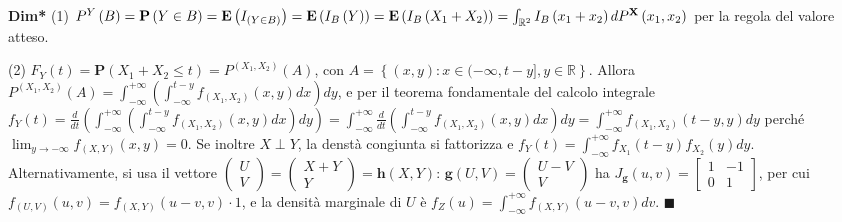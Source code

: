 \documentclass{article}
\begin{document}
\textbf{Dim*} (1) $P^{Y}\left( B\right) =\mathbf{P}\left( Y\in B\right) =%
\mathbf{E}\left( I_{\left( Y\in B\right) }\right) =\mathbf{E}\left(
I_{B}\left( Y\right) \right) =\mathbf{E}\left( I_{B}\left(
X_{1}+X_{2}\right) \right) =\int_{%
\mathbb{R}
^{2}}I_{B}\left( x_{1}+x_{2}\right) dP^{\mathbf{X}}\left( x_{1},x_{2}\right) 
$ per la regola del valore atteso.

(2) $F_{Y}\left( t\right) =\mathbf{P}\left( X_{1}+X_{2}\leq t\right)
=P^{\left( X_{1},X_{2}\right) }\left( A\right) $, con $A=\left\{ \left(
x,y\right) :x\in (-\infty ,t-y],y\in 
\mathbb{R}
\right\} $. Allora $P^{\left( X_{1},X_{2}\right) }\left( A\right)
=\int_{-\infty }^{+\infty }\left( \int_{-\infty }^{t-y}f_{\left(
X_{1},X_{2}\right) }\left( x,y\right) dx\right) dy$, e per il teorema
fondamentale del calcolo integrale $f_{Y}\left( t\right) =\frac{d}{dt}\left(
\int_{-\infty }^{+\infty }\left( \int_{-\infty }^{t-y}f_{\left(
X_{1},X_{2}\right) }\left( x,y\right) dx\right) dy\right) =\int_{-\infty
}^{+\infty }\frac{d}{dt}\left( \int_{-\infty }^{t-y}f_{\left(
X_{1},X_{2}\right) }\left( x,y\right) dx\right) dy=\int_{-\infty }^{+\infty
}f_{\left( X_{1},X_{2}\right) }\left( t-y,y\right) dy$ perch\'{e} $%
\lim_{y\rightarrow -\infty }f_{\left( X,Y\right) }\left( x,y\right) =0$. Se inoltre $X\perp Y$, la denst\`{a}
congiunta si fattorizza e $f_{Y}\left( t\right) =\int_{-\infty }^{+\infty
}f_{X_{1}}\left( t-y\right) f_{X_{2}}\left( y\right) dy$. Alternativamente,
si usa il vettore $\left( 
\begin{array}{c}
U \\ 
V%
\end{array}%
\right) =\left( 
\begin{array}{c}
X+Y \\ 
Y%
\end{array}%
\right) =\mathbf{h}\left( X,Y\right) $: $\mathbf{g}\left( U,V\right) =\left( 
\begin{array}{c}
U-V \\ 
V%
\end{array}%
\right) $ ha $J_{\mathbf{g}}\left( u,v\right) =\left[ 
\begin{array}{cc}
1 & -1 \\ 
0 & 1%
\end{array}%
\right] $, per cui $f_{\left( U,V\right) }\left( u,v\right) =f_{\left(
X,Y\right) }\left( u-v,v\right) \cdot 1$, e la densit\`{a} marginale di $U$ 
\`{e} $f_{Z}\left( u\right) =\int_{-\infty }^{+\infty }f_{\left( X,Y\right)
}\left( u-v,v\right) dv$. $\blacksquare $
\end{document}

